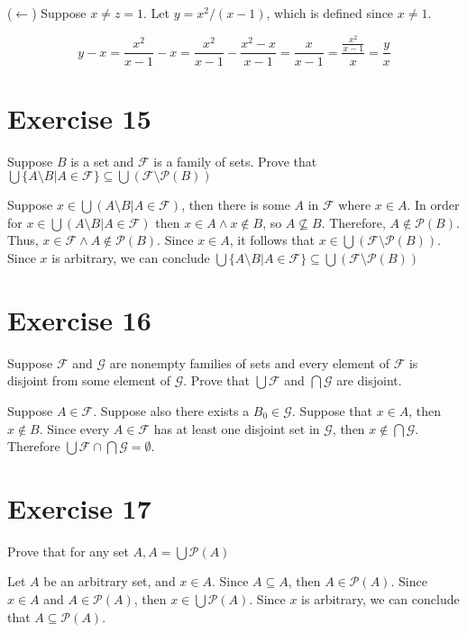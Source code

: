 \documentclass[11pt]{article}
\newcommand{\powerset}[1]{\mathscr{P}(#1)}
\newcommand{\family}[1]{\mathcal{#1}}
\begin{document}
($\leftarrow$) Suppose $x \neq z = 1$. Let $y = x^2 / (x - 1)$, which is defined 
since $x \neq 1$.

$$
y - x = 
\frac{x^2}{x-1} - x = 
\frac{x^2}{x - 1} - \frac{x^2 - x}{x - 1} = 
\frac{x}{x - 1} = 
\frac{\frac{x^2}{x - 1}}{x} = 
\frac{y}{x}
$$

\section*{Exercise 15}

Suppose $B$ is a set and $\family{F}$ is a family of sets. Prove that 
$\bigcup \{A \setminus B | A \in \family{F} \} \subseteq \bigcup (\family{F} \setminus \powerset{B})$

Suppose $x \in \bigcup (A \setminus B | A \in \family{F})$, then there is some 
$A$ in $\family{F}$ where $x \in A$. In order for 
$x \in \bigcup (A \setminus B | A \in \family{F})$
then $x \in A \wedge x \notin B$, so $A \nsubseteq B$. Therefore,
$A \notin \powerset{B}$. Thus, $x \in \family{F} \wedge A \notin \powerset{B}$.
Since $x \in A$, it follows that 
$x \in \bigcup (\family{F} \setminus \powerset{B})$. Since $x$ is arbitrary,
we can conclude
$\bigcup \{A \setminus B | A \in \family{F} \} \subseteq \bigcup (\family{F} \setminus \powerset{B})$

\section*{Exercise 16}

Suppose $\family{F}$ and $\family{G}$ are nonempty families of sets and every 
element of $\family{F}$ is disjoint from some element of $\family{G}$. Prove
that $\bigcup \family{F}$ and $\bigcap \family{G}$ are disjoint.

Suppose $A \in \family{F}$. Suppose also there exists a $B_0 \in \family{G}$.
Suppose that $x \in A$, then $x \notin B$. Since every $A \in \family{F}$ has 
at least one disjoint set in $\family{G}$, then $x \notin \bigcap \family{G}$.
Therefore $\bigcup \family{F} \cap \bigcap \family{G} = \emptyset$.

\section*{Exercise 17}

Prove that for any set $A, A = \bigcup \powerset{A}$

Let $A$ be an arbitrary set, and $x \in A$. Since $A \subseteq A$, then 
$A \in \powerset{A}$. Since $x \in A$ and $A \in \powerset{A}$, then 
$x \in \bigcup \powerset{A}$. Since $x$ is arbitrary, we can conclude
that $A \subseteq \powerset{A}$.
\end{document}
